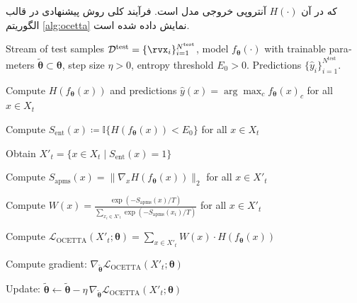 که در آن $H(\cdot)$ آنتروپی خروجی مدل است. فرآیند کلی روش پیشنهادی در قالب الگوریتم \ref{alg:ocetta} نمایش داده شده است.

\begin{algorithm}[t]
	\caption{‌انطباق زمان آزمون مستمر مبتنی بر آنتروپی با آگاهی از داده‌های خارج از توزیع}
	\label{alg:ocetta}
	\begin{latin}
		\begin{algorithmic}[1]
			\Require Stream of test samples $\mathcal{D}^{\mathrm{test}}=\{\rvx_i\}_{i=1}^{N^{\mathrm{test}}}$, 
			model $f_{\bm\theta}(\cdot)$ with trainable parameters $\tilde{\bm\theta}\subset\bm\theta$, 
			step size $\eta>0$, entropy threshold $E_0>0$.
			\Ensure Predictions $\{\hat{y}_i\}_{i=1}^{N^{\mathrm{test}}}$.
			
			\State Compute $H(f_{\bm\theta}(x))$ and predictions 
			$\hat{y}(x) = \arg\max_c f_{\bm\theta}(x)_c$ for all $x \in X_t$
			
			\State Compute $S_{\mathrm{ent}}(x) \coloneqq \mathbb{I}\{H(f_{\bm\theta}(x)) < E_0\}$ for all $x \in X_t$
			
			\State Obtain $X'_t = \{ x \in X_t \mid S_{\mathrm{ent}}(x)=1\}$ 
			
			\State Compute $S_{\mathrm{apms}}(x) = \|\nabla_x H(f_{\bm\theta}(x))\|_2$ for all $x \in X'_t$ 
			
			\State Compute $W(x)=\frac{\exp \!\left(-S_{\mathrm{apms}}(x)/T\right)}{\sum_{x_i \in X'_t}\exp \!\left(-S_{\mathrm{apms}}(x_i)/T\right)}$ for all $x \in X'_t$
			
			\State Compute $\mathcal{L}_{\mathrm{OCETTA}}(X'_t;\bm\theta) = \sum_{x \in X'_t} W(x)\cdot H(f_{\bm\theta}(x))$ 
			
			\State Compute gradient: $\nabla_{\tilde{\bm\theta}} \mathcal{L}_{\mathrm{OCETTA}}(X'_t;\bm\theta)$
			
			\State Update: $\tilde{\bm\theta} \leftarrow \tilde{\bm\theta} - \eta \,\nabla_{\tilde{\bm\theta}} \mathcal{L}_{\mathrm{OCETTA}}(X'_t;\bm\theta)$
			\EndFor
			
		\end{algorithmic}
	\end{latin}
\end{algorithm}



